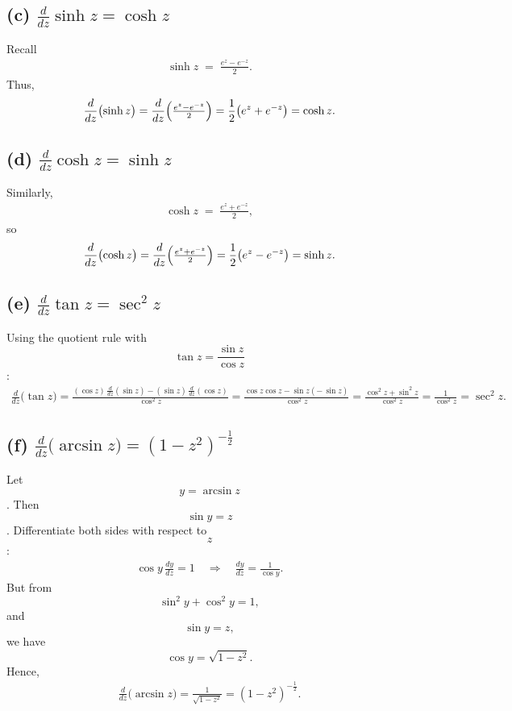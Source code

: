 \documentclass[12pt]{article}
\theoremstyle{definition} %
\theoremstyle{plain} %
\begin{document}
\subsection*{(c) $\displaystyle \frac{d}{dz} \sinh z = \cosh z$}

Recall 
\begin{align}
\sinh z \;=\; \frac{e^z - e^{-z}}{2}.
\end{align}
Thus,
\begin{align}
\frac{d}{dz}\bigl(\sinh z\bigr)
  = \frac{d}{dz}\Bigl(\tfrac{e^z - e^{-z}}{2}\Bigr)
  = \frac{1}{2}\bigl(e^z + e^{-z}\bigr)
  = \cosh z.
\end{align}

\subsection*{(d) $\displaystyle \frac{d}{dz} \cosh z = \sinh z$}

Similarly, 
\begin{align}
\cosh z \;=\; \frac{e^z + e^{-z}}{2},
\end{align}
so
\begin{align}
\frac{d}{dz}\bigl(\cosh z\bigr)
  = \frac{d}{dz}\Bigl(\tfrac{e^z + e^{-z}}{2}\Bigr)
  = \frac{1}{2}\bigl(e^z - e^{-z}\bigr)
  = \sinh z.
\end{align}

\subsection*{(e) $\displaystyle \frac{d}{dz} \tan z = \sec^2 z$}

Using the quotient rule with 
$$\tan z = \frac{\sin z}{\cos z}$$:
\begin{align}
\frac{d}{dz}\bigl(\tan z\bigr)
  = \frac{(\cos z)\,\frac{d}{dz}(\sin z) - (\sin z)\,\frac{d}{dz}(\cos z)}{\cos^2 z}
  = \frac{\cos z \cos z - \sin z(-\,\sin z)}{\cos^2 z}
  = \frac{\cos^2 z + \sin^2 z}{\cos^2 z}
  = \frac{1}{\cos^2 z}
  = \sec^2 z.
\end{align}

\subsection*{(f) $\displaystyle \frac{d}{dz}\bigl(\arcsin z\bigr) 
             = (1 - z^2)^{-\frac{1}{2}}$}

Let $$y = \arcsin z$$.  Then $$\sin y = z$$.  
Differentiate both sides with respect to $$z$$:
\begin{align}
\cos y \,\frac{dy}{dz} = 1 \quad\Longrightarrow\quad
\frac{dy}{dz} = \frac{1}{\cos y}.
\end{align}
But from $$\sin^2 y + \cos^2 y = 1,$$ and $$\sin y = z,$$ we have $$\cos y = \sqrt{1 - z^2}.$$
Hence,
\begin{align}
\frac{d}{dz}\bigl(\arcsin z\bigr) 
  = \frac{1}{\sqrt{1 - z^2}} 
  = (1 - z^2)^{-\tfrac{1}{2}}.
\end{align}
\end{document}
